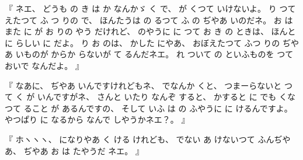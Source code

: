 %
『
ネエ、
%
どうも
の
き
は
か
なんかゞ
く
で、
%
が
くつて
いけないよ。
%
り
つて
えたつて%
ふ
つ
りの
で、
%
ほんたうは
の
るつて
ふ
の
ぢやあ
いのだネ。
%
お
は
また
に
が
お
りの
やう
だけれど、
%
のやうに
に
つて
お
き
の
ときは、
%
ほんとに
らしい
%
に
だよ。
%
り
お
のは、
%
かした
にやあ、
%
おぼえたつて
ふつ
りの
ぢやあ
いものが
からか
らないが
て
るんだネエ。
%
れ
ついて
の
といふものを
つて
おいで
なんだよ。
』

%
『
なあに、
%
ぢやあ
いんですけれどもネ、
%
でなんか
くと、
%
つまーらないと
つて
く
が
いんですがネ、
%
さんと
いたり
なんぞ
すると、
%
かすると
に%
でも%
%
くなつて
ること
が
あるんですの、
%
そして
いふ
は
の%
ふやうに
に
けるんですよ。
%
やつぱり
に
なるから
なんで
しやうかネエ？。
』

%
『
ホヽヽヽ、
%
になりやあ
く
ける
けれども、
%
でない
あ
けないつて
ふんぢやあ、
%
ぢやあ
お
は
たやうだ
ネエ。
』

